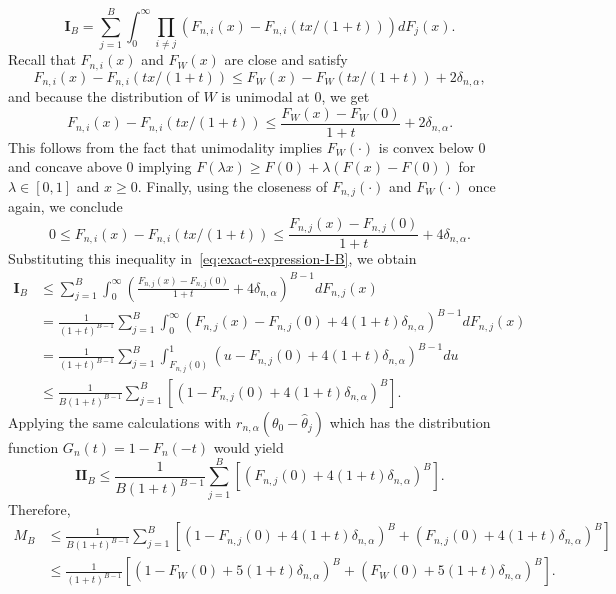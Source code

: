 \documentclass{article}
\numberwithin{myalgctr}{section}
\begin{document}
\begin{equation}\label{eq:exact-expression-I-B}
\mathbf{I}_B = \sum_{j=1}^{B} \int_0^{\infty} \prod_{i\neq j} (F_{n,i}(x) - F_{n,i}(tx/(1 + t)))dF_j(x) .
\end{equation}
Recall that $F_{n,i}(x)$ and $F_W(x)$ are close and satisfy
\[
F_{n,i}(x) - F_{n,i}(tx/(1 + t)) \le F_W(x) - F_W(tx/(1 + t)) + 2\delta_{n,\alpha},
\]
and because the distribution of $W$ is unimodal at $0$, we get 
\[
F_{n,i}(x) - F_{n,i}(tx/(1 + t)) \le \frac{F_W(x) - F_W(0)}{1 + t} + 2\delta_{n,\alpha}.
\]
This follows from the fact that unimodality implies $F_W(\cdot)$ is convex below $0$ and concave above $0$ implying $F(\lambda x) \ge F(0) + \lambda(F(x) - F(0))$ for $\lambda\in[0, 1]$ and $x\ge0$. Finally, using the closeness of $F_{n,j}(\cdot)$ and $F_W(\cdot)$ once again, we conclude
\[
0 \le F_{n,i}(x) - F_{n,i}(tx/(1 + t)) \le \frac{F_{n,j}(x) - F_{n,j}(0)}{1 + t} + 4\delta_{n,\alpha}.
\]
Substituting this inequality in~\eqref{eq:exact-expression-I-B}, we obtain
\begin{align*}
\mathbf{I}_B &\le \sum_{j=1}^B \int_0^{\infty} \left(\frac{F_{n,j}(x) - F_{n,j}(0)}{1 + t} + 4\delta_{n,\alpha}\right)^{B-1}dF_{n,j}(x)\\
&= \frac{1}{(1 + t)^{B-1}}\sum_{j=1}^B\int_0^{\infty} \left(F_{n,j}(x) - F_{n,j}(0) + 4(1 + t)\delta_{n,\alpha}\right)^{B-1}dF_{n,j}(x)\\
&= \frac{1}{(1 + t)^{B-1}}\sum_{j=1}^B\int_{F_{n,j}(0)}^{1} \left(u - F_{n,j}(0) + 4(1 + t)\delta_{n,\alpha}\right)^{B-1}du\\ 
&\le \frac{1}{B(1 + t)^{B-1}}\sum_{j=1}^B \left[\left(1 - F_{n,j}(0) + 4(1 + t)\delta_{n,\alpha}\right)^{B}\right].
\end{align*}
Applying the same calculations with $r_{n,\alpha}(\theta_0 - \widehat{\theta}_j)$ which has the distribution function $G_n(t) = 1 - F_n(-t)$ would yield
\[
\mathbf{II}_B \le \frac{1}{B(1 + t)^{B-1}}\sum_{j=1}^B \left[\left(F_{n,j}(0) + 4(1 + t)\delta_{n,\alpha}\right)^{B}\right].
\]
Therefore,
\begin{equation}\label{eq:almost-final-inequality-M-B}
\begin{split}
M_B &\le \frac{1}{B(1 + t)^{B-1}}\sum_{j=1}^B \left[(1 - F_{n,j}(0) + 4(1 + t)\delta_{n,\alpha})^{B} + (F_{n,j}(0) + 4(1 + t)\delta_{n,\alpha})^{B}\right]\\
&\le \frac{1}{(1 + t)^{B-1}}\left[(1 - F_W(0) + 5(1 + t)\delta_{n,\alpha})^B + (F_W(0) + 5(1 + t)\delta_{n,\alpha})^B\right].
\end{split}
\end{equation}
\end{document}
